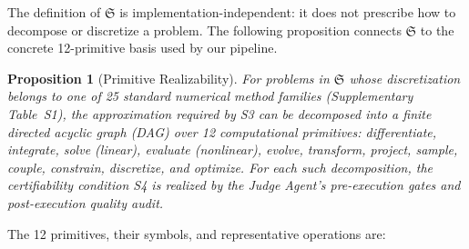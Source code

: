 \documentclass[11pt,a4paper]{article}
\newtheorem{proposition}[definition]{Proposition}
\newcommand{\Sclass}{\mathfrak{S}}
\begin{document}
The definition of $\Sclass$ is implementation-independent: it does not prescribe how to decompose or discretize a problem. The following proposition connects $\Sclass$ to the concrete 12-primitive basis used by our pipeline.

\begin{proposition}[Primitive Realizability]
\label{prop:realizability}
For problems in $\Sclass$ whose discretization belongs to one of 25 standard numerical method families (Supplementary Table~S1), the approximation required by S3 can be decomposed into a finite directed acyclic graph (DAG) over 12 computational primitives: differentiate, integrate, solve (linear), evaluate (nonlinear), evolve, transform, project, sample, couple, constrain, discretize, and optimize. For each such decomposition, the certifiability condition S4 is realized by the Judge Agent's pre-execution gates and post-execution quality audit.
\end{proposition}

\noindent The 12 primitives, their symbols, and representative operations are:
\end{document}
